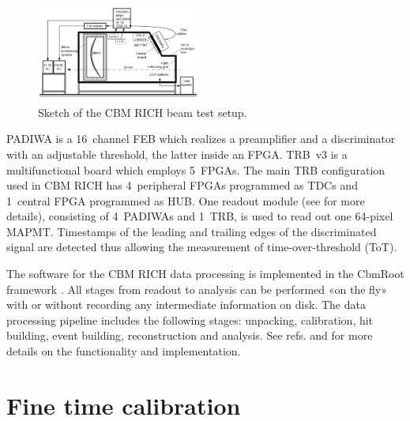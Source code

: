 \documentclass[final,5p,times,twocolumn]{elsarticle}
\begin{document}
\begin{figure}[h]
	\centering
	\includegraphics[width=0.48\textwidth]{figures/Beamtime_eng_RICH2016_poster.png}
	\caption{Sketch of the CBM RICH beam test setup.}
	\label{fig:BeamSetup}
\end{figure}

PADIWA is a 16~channel FEB which realizes a preamplifier and a discriminator with an adjustable threshold, the latter inside an FPGA. TRB~v3 is a multifunctional board which employs 5~FPGAs. The main TRB configuration used in CBM RICH has 4~peripheral FPGAs programmed as TDCs \cite{TDC} and 1~central FPGA programmed as HUB. One readout module (see \cite{PEPAN} for more details), consisting of 4~PADIWAs and 1~TRB, is used to read out one 64-pixel MAPMT. Timestamps of the leading and trailing edges of the discriminated signal are detected thus allowing the measurement of time-over-threshold (ToT).

The software for the CBM RICH data processing is implemented in the CbmRoot framework \cite{SEMEN}. All stages from readout to analysis can be performed «on the fly» with or without recording any intermediate information on disk. The data processing pipeline includes the following stages: unpacking, calibration, hit building, event building, reconstruction and analysis. See refs. \cite{PEPAN} and \cite{RINGS} for more details on the functionality and implementation.


\section{Fine time calibration}
\end{document}
